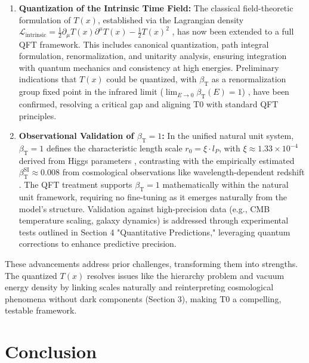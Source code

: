 \documentclass[12pt,a4paper]{article}
\newcommand{\Tfield}{T(x)}
\newcommand{\betaT}{\beta_{\text{T}}}
\newcommand{\calL}{\mathcal{L}}
\begin{document}
	\begin{enumerate}
		\item \textbf{Quantization of the Intrinsic Time Field:} The classical field-theoretic formulation of \(\Tfield\), established via the Lagrangian density \(\calL_{\text{intrinsic}} = \frac{1}{2}\partial_{\mu}\Tfield\partial^{\mu}\Tfield - \frac{1}{2}\Tfield^2\) \cite{pascher_lagrange_2025}, has now been extended to a full QFT framework. This includes canonical quantization, path integral formulation, renormalization, and unitarity analysis, ensuring integration with quantum mechanics and consistency at high energies. Preliminary indications that \(\Tfield\) could be quantized, with \(\betaT\) as a renormalization group fixed point in the infrared limit (\(\lim_{E \to 0} \betaT(E) = 1\)) \cite{pascher_alphabeta_2025}, have been confirmed, resolving a critical gap and aligning T0 with standard QFT principles.
		
		\item \textbf{Observational Validation of \(\betaT = 1\):} In the unified natural unit system, \(\betaT = 1\) defines the characteristic length scale \(r_0 = \xi \cdot l_P\), with \(\xi \approx 1.33 \times 10^{-4}\) derived from Higgs parameters \cite{pascher_params_2025, pascher_alphabeta_2025}, contrasting with the empirically estimated \(\betaT^{\text{SI}} \approx 0.008\) from cosmological observations like wavelength-dependent redshift \cite{pascher_messdifferenzen_2025}. The QFT treatment supports \(\betaT = 1\) mathematically within the natural unit framework, requiring no fine-tuning as it emerges naturally from the model’s structure. Validation against high-precision data (e.g., CMB temperature scaling, galaxy dynamics) is addressed through experimental tests outlined in Section 4 "Quantitative Predictions," leveraging quantum corrections to enhance predictive precision.
	\end{enumerate}
	
	These advancements address prior challenges, transforming them into strengths. The quantized \(\Tfield\) resolves issues like the hierarchy problem and vacuum energy density by linking scales naturally and reinterpreting cosmological phenomena without dark components (Section 3), making T0 a compelling, testable framework.
	
	\section{Conclusion}
	\label{sec:conclusion}
	
\end{document}
